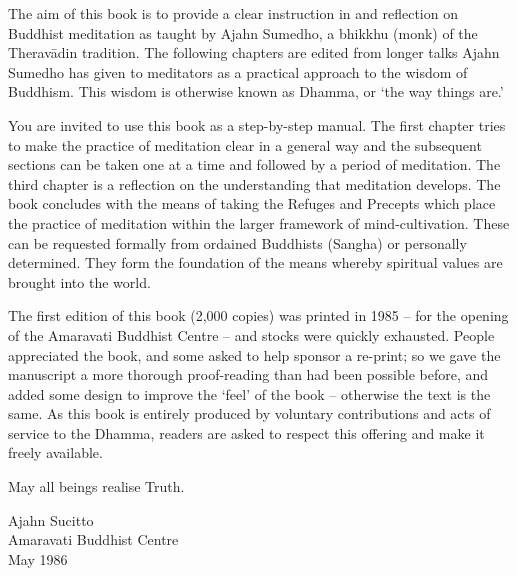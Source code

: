 
The aim of this book is to provide a clear instruction in and reflection on Buddhist meditation as taught by Ajahn Sumedho, a bhikkhu (monk) of the Therav\=adin tradition. The following chapters are edited from longer talks Ajahn Sumedho has given to meditators as a practical approach to the wisdom of Buddhism. This wisdom is otherwise known as Dhamma, or `the way things are.'

You are invited to use this book as a step-by-step manual. The first chapter tries to make the practice of meditation clear in a general way and the subsequent sections can be taken one at a time and followed by a period of meditation. The third chapter is a reflection on the understanding that meditation develops. The book concludes with the means of taking the Refuges and Precepts which place the practice of meditation within the larger framework of mind-cultivation. These can be requested formally from ordained Buddhists (Sangha) or personally determined. They form the foundation of the means whereby spiritual values are brought into the world.

The first edition of this book (2,000 copies) was printed in 1985 -- for the opening of the Amaravati Buddhist Centre -- and stocks were quickly exhausted. People appreciated the book, and some asked to help sponsor a re-print; so we gave the manuscript a more thorough proof-reading than had been possible before, and added some design to improve the `feel' of the book -- otherwise the text is the same. As this book is entirely produced by voluntary contributions and acts of service to the Dhamma, readers are asked to respect this offering and make it freely available.

May all beings realise Truth.

\bigskip
{\par\raggedleft
Ajahn Sucitto\\
Amaravati Buddhist Centre\\
May 1986
\par}

